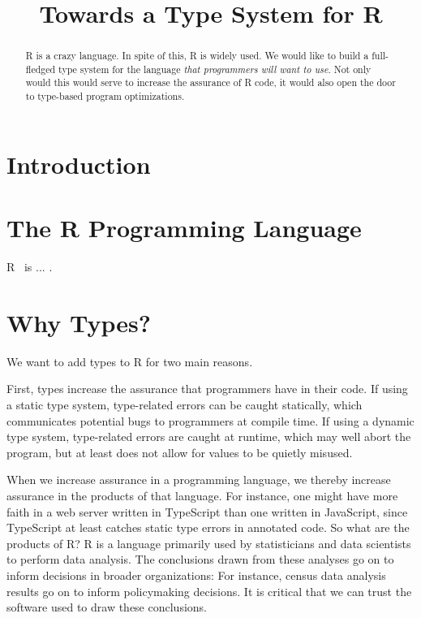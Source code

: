 \documentclass[sigplan,10pt,review,anonymous]{acmart}\settopmatter{printfolios=true,printccs=false,printacmref=false}
\begin{document}
\title{Towards a Type System for R}

\begin{abstract}

R is a crazy language.
In spite of this, R is widely used.
We would like to build a full-fledged type system for the language {\it that programmers will want to use}.
Not only would this would serve to increase the assurance of R code, it would also open the door to type-based program optimizations.

\end{abstract}

\maketitle


%
%
%
%
\section{Introduction}



%
%
%
%
\section{The R Programming Language}

R~\cite{R_man} is ... .

%
%
%
%
\section{Why Types?}

We want to add types to R for two main reasons.

First, types increase the assurance that programmers have in their code.
If using a static type system, type-related errors can be caught statically, which communicates potential bugs to programmers at compile time.
If using a dynamic type system, type-related errors are caught at runtime, which may well abort the program, but at least does not allow for values to be quietly misused.

When we increase assurance in a programming language, we thereby increase assurance in the products of that language.
For instance, one might have more faith in a web server written in TypeScript than one written in JavaScript, since TypeScript at least catches static type errors in annotated code.
So what are the products of R?
R is a language primarily used by statisticians and data scientists to perform data analysis. 
The conclusions drawn from these analyses go on to inform decisions in broader organizations:
For instance, census data analysis results go on to inform policymaking decisions.
It is critical that we can trust the software used to draw these conclusions.
\end{document}
